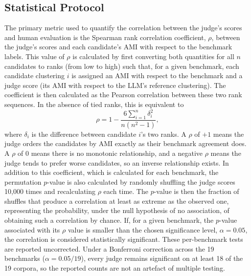 \documentclass[11pt,a4paper,oneside]{report}
\begin{document}
\subsection{Statistical Protocol}\label{sec:RQ1_STATPROT}

The primary metric used to quantify the correlation between the judge's scores and human evaluation is the Spearman rank correlation coefficient, $\rho$, between the judge's scores and each candidate's AMI with respect to the benchmark labels. This value of $\rho$ is calculated by first converting both quantities for all $n$ candidates to ranks (from low to high) such that, for a given benchmark, each candidate clustering $i$ is assigned an AMI with respect to the benchmark and a judge score (its AMI with respect to the LLM's reference clustering). The coefficient is then calculated as the Pearson correlation between these two rank sequences. In the absence of tied ranks, this is equivalent to
\[
\rho = 1 - \frac{6\sum_{i=1}^{n} \delta_i^{2}}{n(n^{2}-1)},
\]
where $\delta_i$ is the difference between candidate $i$'s two ranks. A $\rho$ of $+1$ means the judge orders the candidates by AMI exactly as their benchmark agreement does. A $\rho$ of $0$ means there is no monotonic relationship, and a negative $\rho$ means the judge tends to prefer worse candidates, so an inverse relationship exists. In addition to this coefficient, which is calculated for each benchmark, the permutation $p$-value is also calculated by randomly shuffling the judge scores 10{,}000 times and recalculating $\rho$ each time. The $p$-value is then the fraction of shuffles that produce a correlation at least as extreme as the observed one, representing the probability, under the null hypothesis of no association, of obtaining such a correlation by chance. If, for a given benchmark, the $p$-value associated with its $\rho$ value is smaller than the chosen significance level, $\alpha = 0.05$, the correlation is considered statistically significant. These per-benchmark tests are reported uncorrected. Under a Bonferroni correction across the 19 benchmarks ($\alpha = 0.05/19$), every judge remains significant on at least 18 of the 19 corpora, so the reported counts are not an artefact of multiple testing.
\end{document}

